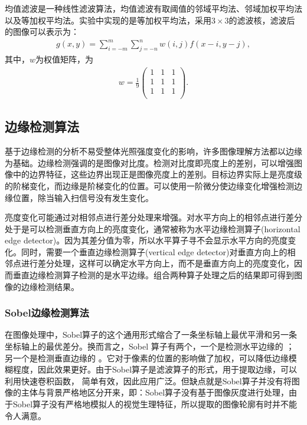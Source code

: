 \documentclass{hitreport}
\begin{document}
均值滤波是一种线性滤波算法，均值滤波有取阈值的邻域平均法、邻域加权平均法以及等加权平均法。实验中实现的是等加权平均法，采用$3\times 3$的滤波核，滤波后的图像可以表示为：
\begin{align}
g\left(x,y\right) = \sum_{i=-m}^{m}\sum_{j=-n}^{n}w\left(i,j\right)f\left(x-i,y-j\right),
\end{align}
其中，$w$为权值矩阵，为
\begin{align}
w=\frac{1}{9}\left( \begin{matrix}
	1&		1&		1\\
	1&		1&		1\\
	1&		1&		1\\
\end{matrix} \right).
\end{align}

\subsection{边缘检测算法}

基于边缘检测的分析不易受整体光照强度变化的影响，许多图像理解方法都以边缘为基础。边缘检测强调的是图像对比度。检测对比度即亮度上的差别，可以增强图像中的边界特征，这些边界出现正是图像亮度上的差别。目标边界实际上是亮度级的阶梯变化，而边缘是阶梯变化的位置。可以使用一阶微分使边缘变化增强检测边缘位置，除当输入扫信号没有发生变化。

亮度变化可能通过对相邻点进行差分处理来增强。对水平方向上的相邻点进行差分处于是可以检测垂直方向上的亮度变化，通常被称为水平边缘检测算子(horizontal edge detector)。因为其差分值为零，所以水平算子寻不会显示水平方向的亮度变化。同时，需要一个垂直边缘检测算子(vertical edge detector)对垂直方向上的相邻点进行差分处理，这样可以确定水平方向上，而不是垂直方向上的亮度变化，因而垂直边缘检测算子检测的是水平边缘。组合两种算子处理之后的结果即可得到图像的边缘检测结果。

\subsubsection{Sobel边缘检测算法}

在图像处理中，Sobel算子的这个通用形式缩合了一条坐标轴上最优平滑和另一条坐标轴上的最优差分。换而言之，Sobel 算子有两个，一个是检测水平边缘的 ；另一个是检测垂直边缘的 。它对于像素的位置的影响做了加权，可以降低边缘模糊程度，因此效果更好。由于Sobel算子是滤波算子的形式，用于提取边缘，可以利用快速卷积函数， 简单有效，因此应用广泛。但缺点就是Sobel算子并没有将图像的主体与背景严格地区分开来，即：Sobel算子没有基于图像灰度进行处理，由于Sobel算子没有严格地模拟人的视觉生理特征，所以提取的图像轮廓有时并不能令人满意。
\end{document}

